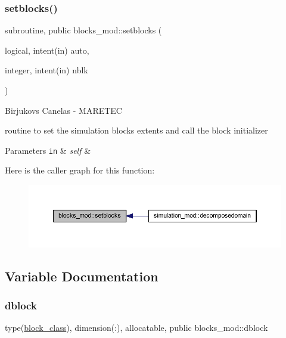 \subsubsection{\texorpdfstring{setblocks()}{setblocks()}}
{\footnotesize\ttfamily subroutine, public blocks\+\_\+mod\+::setblocks (\begin{DoxyParamCaption}\item[{logical, intent(in)}]{auto,  }\item[{integer, intent(in)}]{nblk }\end{DoxyParamCaption})}



Birjukovs Canelas -\/ M\+A\+R\+E\+T\+EC 

routine to set the simulation blocks extents and call the block initializer 
\begin{DoxyParams}[1]{Parameters}
\mbox{\tt in}  & {\em self} & \\
\hline
\end{DoxyParams}
Here is the caller graph for this function\+:
\nopagebreak
\begin{figure}[H]
\begin{center}
\leavevmode
\includegraphics[width=350pt]{namespaceblocks__mod_a3312d23e0268d67aaf99d579aa57d0e7_icgraph}
\end{center}
\end{figure}


\subsection{Variable Documentation}
\mbox{\label{namespaceblocks__mod_ac8ad6e3cf7a812f95dadb592336aca50}} 
\subsubsection{\texorpdfstring{dblock}{dblock}}
{\footnotesize\ttfamily type(\hyperlink{structblocks__mod_1_1block__class}{block\+\_\+class}), dimension(\+:), allocatable, public blocks\+\_\+mod\+::dblock}

